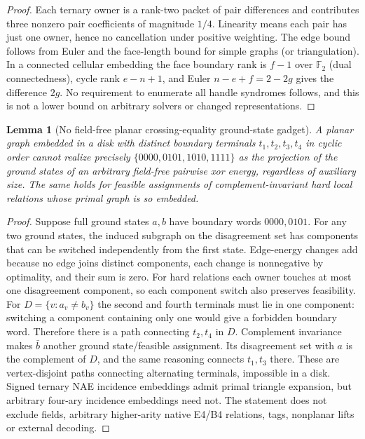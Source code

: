 \documentclass[11pt]{article}
\newtheorem{lemma}[theorem]{Lemma}
\begin{document}
\begin{proof}
Each ternary owner is a rank-two packet of pair differences and contributes three nonzero pair coefficients of magnitude $1/4$. Linearity means each pair has just one owner, hence no cancellation under positive weighting. The edge bound follows from Euler and the face-length bound for simple graphs (or triangulation). In a connected cellular embedding the face boundary rank is $f-1$ over $\mathbb F_2$ (dual connectedness), cycle rank $e-n+1$, and Euler $n-e+f=2-2g$ gives the difference $2g$. No requirement to enumerate all handle syndromes follows, and this is not a lower bound on arbitrary solvers or changed representations.
\end{proof}
\begin{lemma}[No field-free planar crossing-equality ground-state gadget]\label{lem:m27-cross}
A planar graph embedded in a disk with distinct boundary terminals $t_1,t_2,t_3,t_4$ in cyclic order cannot realize precisely $\{0000,0101,1010,1111\}$ as the projection of the ground states of an arbitrary field-free pairwise xor energy, regardless of auxiliary size. The same holds for feasible assignments of complement-invariant hard local relations whose \emph{primal} graph is so embedded.
\end{lemma}
\begin{proof}
Suppose full ground states $a,b$ have boundary words $0000,0101$. For any two ground states, the induced subgraph on the disagreement set has components that can be switched independently from the first state. Edge-energy changes add because no edge joins distinct components, each change is nonnegative by optimality, and their sum is zero. For hard relations each owner touches at most one disagreement component, so each component switch also preserves feasibility. For $D=\{v:a_v\ne b_v\}$ the second and fourth terminals must lie in one component: switching a component containing only one would give a forbidden boundary word. Therefore there is a path connecting $t_2,t_4$ in $D$. Complement invariance makes $\bar b$ another ground state/feasible assignment. Its disagreement set with $a$ is the complement of $D$, and the same reasoning connects $t_1,t_3$ there. These are vertex-disjoint paths connecting alternating terminals, impossible in a disk. Signed ternary NAE incidence embeddings admit primal triangle expansion, but arbitrary four-ary incidence embeddings need not. The statement does not exclude fields, arbitrary higher-arity native E4/B4 relations, tags, nonplanar lifts or external decoding.
\end{proof}
\end{document}
